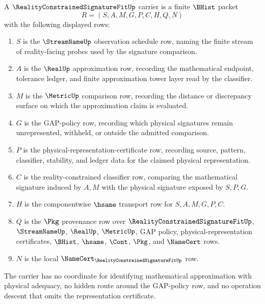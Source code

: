 \begin{definition}
\label{def:reality-constrained-signature-fit-carrier}
A $\RealityConstrainedSignatureFitUp$ carrier is a finite $\BHist$ packet
$$
R=(S,A,M,G,P,C,H,Q,N)
$$
with the following displayed rows:
\begin{enumerate}
\item $S$ is the $\StreamNameUp$ observation schedule row, naming the finite stream of reality-facing probes used by the signature comparison.
\item $A$ is the $\RealUp$ approximation row, recording the mathematical endpoint, tolerance ledger, and finite approximation tower layer read by the classifier.
\item $M$ is the $\MetricUp$ comparison row, recording the distance or discrepancy surface on which the approximation claim is evaluated.
\item $G$ is the GAP-policy row, recording which physical signatures remain unrepresented, withheld, or outside the admitted comparison.
\item $P$ is the physical-representation-certificate row, recording source, pattern, classifier, stability, and ledger data for the claimed physical representation.
\item $C$ is the reality-constrained classifier row, comparing the mathematical signature induced by $A,M$ with the physical signature exposed by $S,P,G$.
\item $H$ is the componentwise $\hsame$ transport row for $S,A,M,G,P,C$.
\item $Q$ is the $\Pkg$ provenance row over $\RealityConstrainedSignatureFitUp$, $\StreamNameUp$, $\RealUp$, $\MetricUp$, GAP policy, physical-representation certificates, $\BHist$, $\hsame$, $\Cont$, $\Pkg$, and $\NameCert$ rows.
\item $N$ is the local $\NameCert_{\RealityConstrainedSignatureFitUp}$ row.
\end{enumerate}
The carrier has no coordinate for identifying mathematical approximation with physical adequacy, no hidden route around the GAP-policy row, and no operation descent that omits the representation certificate.
\end{definition}

